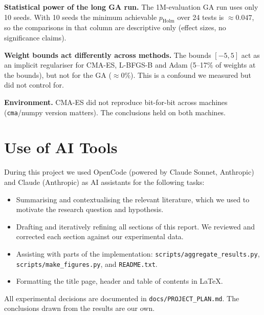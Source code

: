 \documentclass[11pt]{article}
\newcommand{\cmaes}{CMA-ES}
\newcommand{\lbfgs}{L-BFGS-B}
\begin{document}
\textbf{Statistical power of the long GA run.} The 1M-evaluation GA run uses
only 10 seeds. With 10 seeds the minimum achievable $p_{\mathrm{Holm}}$ over
24 tests is $\approx0.047$, so the comparisons in that column are descriptive
only (effect sizes, no significance claims).

\textbf{Weight bounds act differently across methods.} The bounds $[-5,5]$ act
as an implicit regulariser for \cmaes, \lbfgs{} and Adam (5--17\% of weights
at the bounds), but not for the GA ($\approx0\%$). This is a confound we
measured but did not control for.

\textbf{Environment.} \cmaes{} did not reproduce bit-for-bit across machines
(\texttt{cma}/numpy version matters). The conclusions held on both machines.

\section*{Use of AI Tools}

During this project we used OpenCode (powered by Claude Sonnet, Anthropic) and Claude (Anthropic)
as AI assistants for the following tasks:

\begin{itemize}
  \item Summarising and contextualising the relevant literature, which we used to motivate the
        research question and hypothesis.
  \item Drafting and iteratively refining all sections of this report. We reviewed and corrected
        each section against our experimental data.
  \item Assisting with parts of the implementation: \texttt{scripts/aggregate\_results.py},
        \texttt{scripts/make\_figures.py}, and \texttt{README.txt}.
  \item Formatting the title page, header and table of contents in \LaTeX.
\end{itemize}

All experimental decisions are documented in \texttt{docs/PROJECT\_PLAN.md}. The conclusions drawn
from the results are our own.



\end{document}
